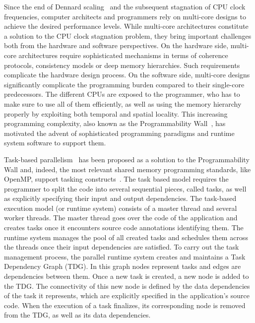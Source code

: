
Since the end of Dennard scaling~\cite{Dennard74} and the subsequent stagnation of CPU clock frequencies, computer architects and programmers rely on multi-core designs to achieve the desired performance levels.
While multi-core architectures constitute a solution to the CPU clock stagnation problem, they bring important challenges both from the hardware and software perspectives.
On the hardware side, multi-core architectures require sophisticated mechanisms in terms of coherence protocols, consistency models or deep memory hierarchies. 
Such requirements complicate the hardware design process.
On the software side, multi-core designs significantly complicate the programming burden compared to their single-core predecessors.
The different CPUs are exposed to the programmer, who has to make sure to use all of them efficiently, as well as using the memory hierarchy properly by exploiting both temporal and spatial locality.
This increasing programming complexity, also known as the Programmability Wall~\cite{Chapman2007}, has motivated the advent of sophisticated programming paradigms and runtime system software to support them.

Task-based parallelism~\cite{Blumofe:PPoPP1995, Reinders2007, Bauer2012, OmpSs} has been proposed as a solution to the Programmability Wall and, indeed, the most relevant shared memory programming standards, like OpenMP, support tasking constructs~\cite{OpenMP4.0:Manual2015}.
The task based model requires the programmer to split the code into several sequential pieces, called tasks, as well as explicitly specifying their input and output dependencies. 
The task-based execution model (or runtime system) consists of a master thread and several worker threads. The master thread goes over the code of the application and creates tasks once it encounters source code annotations identifying them. 
The runtime system manages the pool of all created tasks and schedules them across the threads once their input dependencies are satisfied.
To carry out the task management process, the parallel runtime system creates and maintains a Task Dependency Graph (TDG).
In this graph nodes represent tasks and edges are dependencies between them.
Once a new task is created, a new node is added to the TDG. 
The connectivity of this new node is defined by the data dependencies of the task it represents, which are explicitly specified in the application's source code.
When the execution of a task finalizes, its corresponding node is removed from the TDG, as well as its data dependencies.

